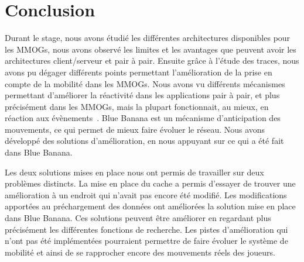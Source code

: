 \section{Conclusion}
	Durant le stage, nous avons étudié les différentes architectures disponibles pour les MMOGs, nous avons observé les limites et les avantages que peuvent avoir les architectures client/serveur et pair à pair. Ensuite grâce à l'étude des traces, nous avons pu dégager différents points permettant l'amélioration de la prise en compte de la mobilité dans les MMOGs. Nous avons vu différents mécanismes permettant d'améliorer la réactivité dans les applications pair à pair, et plus précisément dans les MMOGs, mais la plupart fonctionnait, au mieux, en réaction aux évènements~\cite{10.1109/SRDS.2006.33}. Blue Banana est un mécanisme d'anticipation des mouvements, ce qui permet de mieux faire évoluer le réseau. Nous avons développé des solutions d'amélioration, en nous appuyant sur ce qui a été fait dans Blue Banana.\\

	\par Les deux solutions mises en place nous ont permis de travailler sur deux problèmes distincts. La mise en place du cache a permis d'essayer de trouver une amélioration à un endroit qui n'avait pas encore été modifié. Les modifications apportées au préchargement des données ont améliorées la solution mise en place dans Blue Banana. Ces solutions peuvent être améliorer en regardant plus précisément les différentes fonctions de recherche. Les pistes d'amélioration qui n'ont pas été implémentées pourraient permettre de faire évoluer le système de mobilité et ainsi de se rapprocher encore des mouvements réels des joueurs. 	
